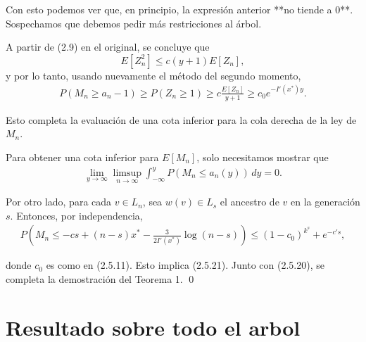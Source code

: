 \documentclass[12pt]{report}
\begin{document}
Con esto podemos ver que, en principio, la expresión anterior **no tiende a 0**. Sospechamos que debemos pedir más restricciones al árbol.

\vspace{5em}

A partir de (2.9) en el original, se concluye que
\[
E[Z_n^2] \leq c(y + 1) E[Z_n],
\]
y por lo tanto, usando nuevamente el método del segundo momento,
\begin{align}
P(M_n \geq a_n - 1) \geq P(Z_n \geq 1) \geq c \frac{E[Z_n]}{y + 1} \geq c_0 e^{-I'(x^*) y}.
\end{align}

Esto completa la evaluación de una cota inferior para la cola derecha de la ley de $M_n$.

Para obtener una cota inferior para $E[M_n]$, solo necesitamos mostrar que
\begin{align}
\lim_{y \to \infty} \limsup_{n \to \infty} \int_{-\infty}^{y} P(M_n \leq a_n(y)) \, dy = 0. 
\end{align}

Por otro lado, para cada $v \in L_n$, sea $w(v) \in L_s$ el ancestro de $v$ en la generación $s$. Entonces, por independencia,
\begin{align}
P\left(M_n \leq -cs + (n - s)x^* - \frac{3}{2I'(x^*)} \log(n - s) \right) \leq (1 - c_0)^{k^s} + e^{-c's},
\end{align}

donde $c_0$ es como en (2.5.11). Esto implica (2.5.21). Junto con (2.5.20), se completa la demostración del Teorema 1. \qed



\section{Resultado sobre todo el arbol}
\end{document}
